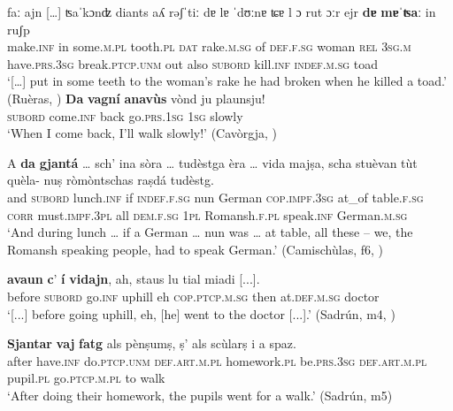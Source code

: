 \ea
\label{ex:tempcltgu1}
\gll    […] faː ajn […] ʦaˈkɔnʣ diants aʎ rǝʃˈtiː dɐ lɐ ˈdʊːnɐ ʨɐ l ɔ rut ɔːr ejr \textbf{dɐ} \textbf{mɐˈʦaː} in ruʃp\\
{} make.\textsc{inf} in {} some.\textsc{m.pl} tooth.\textsc{pl} \textsc{dat} rake.\textsc{m.sg} of \textsc{def.f.sg} woman \textsc{rel} \textsc{3sg.m} have.\textsc{prs.3sg} break.\textsc{ptcp.unm} out also \textsc{subord} kill.\textsc{inf} \textsc{indef.m.sg} toad\\
\glt `[…] put in some teeth to the woman’s rake he had broken when he killed a toad.' (Ruèras, \citealt[8]{Valär2013b})
\z
\ea
\label{ex:nonfintempcl1}
\gll    \textbf{Da} \textbf{vagní} \textbf{anavùs} vònd ju plaunsju!\\
\textsc{subord} come.\textsc{inf} back go.\textsc{prs.1sg} \textsc{1sg} slowly \\
\glt `When I come back, I’ll walk slowly!' (Cavòrgja, \citealt[120]{Büchli1966})
\z

\ea
\label{ex:nonfintempcl4}
\gll    A \textbf{da} \textbf{gjantá} … sch’ ina sòra … tudèstga èra … vida majṣa, scha stuèvan tùt quèla- nuṣ ròmòntschas raṣdá tudèstg.\\
and \textsc{subord} lunch.\textsc{inf} {} if \textsc{indef.f.sg} nun {} German \textsc{cop.impf.3sg} {} at\_of table.\textsc{f.sg} \textsc{corr} must.\textsc{impf.3pl} all \textsc{dem.f.sg} \textsc{1pl} Romansh.\textsc{f.pl} speak.\textsc{inf} German.\textsc{m.sg}\\
\glt `And during lunch … if a German … nun was … at table, all these – we, the Romansh speaking people, had to speak German.' (Camischùlas, f6, )
\z


\ea
\label{ex:nonfintempcl3}
\gll  [...] \textbf{avaun} \textbf{c}’ \textbf{í} \textbf{vidajn}, ah, staus lu tial miadi [...].\\
{} before \textsc{subord} go.\textsc{inf} uphill eh \textsc{cop.ptcp.m.sg} then  at.\textsc{def.m.sg} doctor\\
\glt `[...] before going uphill, eh, [he] went to the doctor [...].' (Sadrún, m4, )
\z

\ea
\label{ex:sjantarnonf1}
\gll \textbf{Sjantar} \textbf{vaj} \textbf{fatg} als pènṣumṣ, ṣ' als scùlarṣ i a spaz.\\
after have.\textsc{inf} do.\textsc{ptcp.unm} \textsc{def.art.m.pl} homework.\textsc{pl} be.\textsc{prs.3sg} \textsc{def.art.m.pl} pupil.\textsc{pl} go.\textsc{ptcp.m.pl} to walk\\
\glt `After doing their homework, the pupils went for a walk.' (Sadrún, m5)
\z

